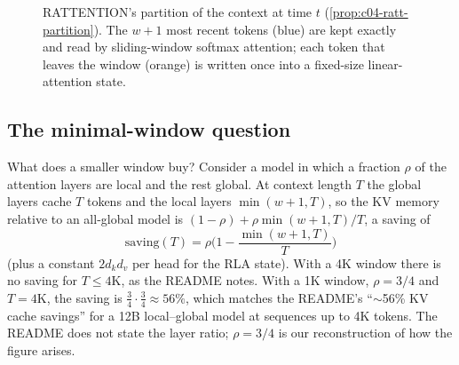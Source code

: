 \begin{figure}[t]
\centering
{}
\caption{RATTENTION's partition of the context at time $t$ (\cref{prop:c04-ratt-partition}). The
$w+1$ most recent tokens (blue) are kept exactly and read by sliding-window softmax attention; each
token that leaves the window (orange) is written once into a fixed-size linear-attention state.}
\label{fig:c04-ratt}
\end{figure}

\subsection{The minimal-window question}

What does a smaller window buy? Consider a model in which a fraction $\rho$ of the attention layers
are local and the rest global. At context length $T$ the global layers cache $T$ tokens and the
local layers $\min(w+1,T)$, so the KV memory relative to an all-global model is
$(1-\rho)+\rho\min(w+1,T)/T$, a saving of
\begin{equation}\label{eq:c04-ratt-saving}
  \text{saving}(T)=\rho\Big(1-\frac{\min(w+1,T)}{T}\Big)
\end{equation}
(plus a constant $2d_kd_v$ per head for the RLA state). With a 4K window there is no saving for
$T\le4\mathrm{K}$, as the README notes. With a 1K window, $\rho=3/4$ and $T=4\mathrm{K}$, the saving
is $\tfrac34\cdot\tfrac34\approx56\%$, which matches the README's ``$\sim$56\% KV cache savings''
for a 12B local--global model at sequences up to 4K tokens. The README does not state the layer
ratio; $\rho=3/4$ is our reconstruction of how the figure arises.

